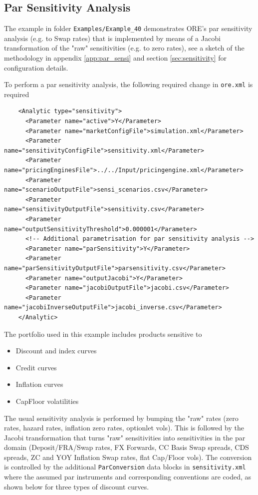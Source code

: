 \documentclass[12pt, a4paper]{article}
\begin{document}
\subsection{Par Sensitivity Analysis}%
\label{example:40}

The example in folder {\tt Examples/Example\_40}  demonstrates ORE's par sensitivity analysis (e.g. to Swap rates) 
that is implemented  by means of a Jacobi transformation of the "raw" sensitivities (e.g. to zero rates), see a sketch of the 
methodology in appendix \ref{app:par_sensi} and section \ref{sec:sensitivity} for configuration details.

To perform a par sensitivity analysis, the following required change in {\tt ore.xml} is required

\begin{verbatim}
    <Analytic type="sensitivity">
      <Parameter name="active">Y</Parameter>
      <Parameter name="marketConfigFile">simulation.xml</Parameter>
      <Parameter name="sensitivityConfigFile">sensitivity.xml</Parameter>
      <Parameter name="pricingEnginesFile">../../Input/pricingengine.xml</Parameter>
      <Parameter name="scenarioOutputFile">sensi_scenarios.csv</Parameter>
      <Parameter name="sensitivityOutputFile">sensitivity.csv</Parameter>
      <Parameter name="outputSensitivityThreshold">0.000001</Parameter>
      <!-- Additional parametrisation for par sensitivity analysis -->
      <Parameter name="parSensitivity">Y</Parameter>
      <Parameter name="parSensitivityOutputFile">parsensitivity.csv</Parameter>
      <Parameter name="outputJacobi">Y</Parameter>
      <Parameter name="jacobiOutputFile">jacobi.csv</Parameter>
      <Parameter name="jacobiInverseOutputFile">jacobi_inverse.csv</Parameter>
    </Analytic>
\end{verbatim}

The portfolio used in this example includes products sensitive to 
\begin{itemize}
\item Discount and index curves
\item Credit curves
\item Inflation curves
\item CapFloor volatilities
\end{itemize}

The usual sensitivity analysis is performed by bumping the "raw" rates (zero rates, hazard rates, inflation zero rates, optionlet vols).
This is followed by the Jacobi transformation that turns "raw" sensitivities  into sensitivities in the par domain (Deposit/FRA/Swap rates, FX Forwards, CC Basis Swap spreads, 
CDS spreads, ZC and YOY Inflation Swap rates, flat Cap/Floor vols). The conversion is controlled by the additional {\tt ParConversion} data blocks 
in {\tt sensitivity.xml} where the assumed par instruments and corresponding conventions are coded, as shown below for three types of discount curves.
\end{document}
